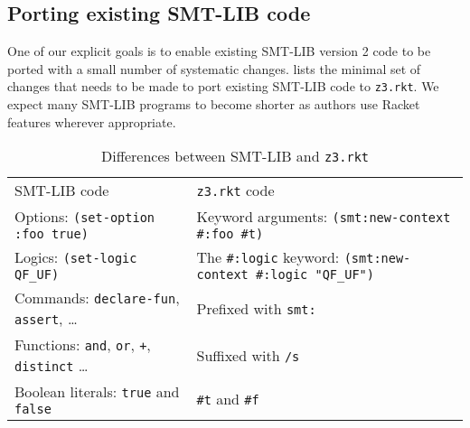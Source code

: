 \subsection{Porting existing SMT-LIB code}
\label{sec:porting-smt-lib}

One of our explicit goals is to enable existing SMT-LIB version 2 code to be
ported with a small number of systematic changes. 
lists the minimal set of changes that needs to be made to port
existing SMT-LIB code to \texttt{z3.rkt}. We expect many SMT-LIB programs
to become shorter as authors use Racket features wherever appropriate.

\begin{table}[hbt]
\caption{Differences between SMT-LIB and \texttt{z3.rkt}}
\label{tab:smt-porting}
\begin{center}
\begin{tabularx}{0.91\textwidth}{lX}
\hline\noalign{\smallskip}
SMT-LIB code & \texttt{z3.rkt} code \\
\noalign{\smallskip}
\hline
\noalign{\smallskip}
Options: \texttt{(set-option :foo true)} & Keyword arguments: \newline \texttt{(smt:new-context \#:foo \#t)} \\

Logics: \texttt{(set-logic QF\_UF)} & The \texttt{\#:logic} keyword: \newline \texttt{(smt:new-context \#:logic "QF\_UF")} \\

Commands: \texttt{declare-fun}, \texttt{assert}, \ldots & Prefixed with \texttt{smt:} \\

Functions: \texttt{and}, \texttt{or}, \texttt{+}, \texttt{distinct} \ldots & Suffixed with \texttt{/s} \\

Boolean literals: \texttt{true} and \texttt{false} & \texttt{\#t} and \texttt{\#f} \\

\hline
\end{tabularx}
\end{center}
\end{table}
